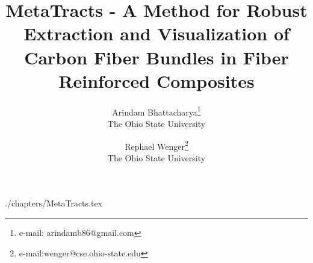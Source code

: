 \documentclass{vgtc}                          %
\title{MetaTracts - A Method for Robust Extraction and Visualization of Carbon Fiber Bundles in Fiber Reinforced Composites}
\author{Arindam Bhattacharya\thanks{e-mail: arindamb86@gmail.com}\\ %
     \scriptsize The Ohio State University %
\and Rephael Wenger\thanks{e-mail:wenger@cse.ohio-state.edu}\\ %
    \scriptsize The Ohio State University}
\begin{document}


\maketitle

 {./chapters/MetaTracts.tex}





\end{document}
